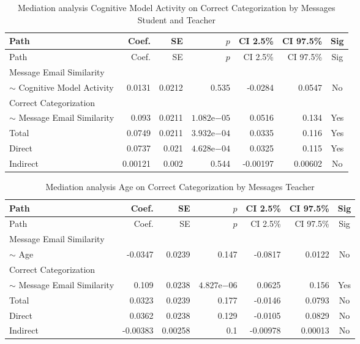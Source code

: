 \begin{longtable}{lrrrrrc}
            \caption{Mediation analysis Cognitive Model Activity on Correct Categorization by  Messages Student and Teacher}\label{tab:mediation Cognitive Model Activity on Correct Categorization by  Messages Student and Teacher}\\
            \toprule
            Path & Coef. & SE & $p$ & CI 2.5\% & CI 97.5\% & Sig \\
            \midrule
            \endfirsthead
            \toprule
            Path & Coef. & SE & $p$ & CI 2.5\% & CI 97.5\% & Sig \\
            \midrule
            \endhead
            \bottomrule
            \endfoot
            Message Email Similarity\\ $\sim$ Cognitive Model Activity & 0.0131 & 0.0212 & 0.535 & -0.0284 & 0.0547 & No \\
Correct Categorization\\ $\sim$ Message Email Similarity & 0.093 & 0.0211 & $1.082\mathrm{e}{-05}$ & 0.0516 & 0.134 & Yes \\
Total & 0.0749 & 0.0211 & $3.932\mathrm{e}{-04}$ & 0.0335 & 0.116 & Yes \\
Direct & 0.0737 & 0.021 & $4.628\mathrm{e}{-04}$ & 0.0325 & 0.115 & Yes \\
Indirect & 0.00121 & 0.002 & 0.544 & -0.00197 & 0.00602 & No \\
\end{longtable}

\begin{longtable}{lrrrrrc}
            \caption{Mediation analysis Age on Correct Categorization by  Messages Teacher}\label{tab:mediation Age on Correct Categorization by  Messages Teacher}\\
            \toprule
            Path & Coef. & SE & $p$ & CI 2.5\% & CI 97.5\% & Sig \\
            \midrule
            \endfirsthead
            \toprule
            Path & Coef. & SE & $p$ & CI 2.5\% & CI 97.5\% & Sig \\
            \midrule
            \endhead
            \bottomrule
            \endfoot
            Message Email Similarity\\ $\sim$ Age & -0.0347 & 0.0239 & 0.147 & -0.0817 & 0.0122 & No \\
Correct Categorization\\ $\sim$ Message Email Similarity & 0.109 & 0.0238 & $4.827\mathrm{e}{-06}$ & 0.0625 & 0.156 & Yes \\
Total & 0.0323 & 0.0239 & 0.177 & -0.0146 & 0.0793 & No \\
Direct & 0.0362 & 0.0238 & 0.129 & -0.0105 & 0.0829 & No \\
Indirect & -0.00383 & 0.00258 & 0.1 & -0.00978 & 0.00013 & No \\
\end{longtable}

